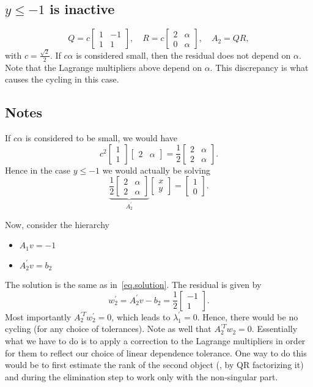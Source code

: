 \documentclass[12pt]{article}
\begin{document}
\subsection{$y \leq -1$ is inactive}

\[
Q = c\begin{bmatrix} 1 & -1 \\ 1 & 1\end{bmatrix}, \quad
R = c\begin{bmatrix} 2 & \alpha \\ 0 & \alpha \end{bmatrix}, \quad
A_2 = QR,
\]
%
with $c = \frac{\sqrt{2}}{2}$. If $c\alpha$ is considered small, then the residual does not depend
on $\alpha$. Note that the Lagrange multipliers above depend on $\alpha$. This discrepancy is what
causes the cycling in this case.

\subsection{Notes}

If $c\alpha$ is considered to be small, we would have
%
\[
c^2\begin{bmatrix} 1 \\ 1 \end{bmatrix}
\begin{bmatrix} 2 & \alpha \end{bmatrix} =
\frac{1}{2}\begin{bmatrix} 2 & \alpha \\ 2 & \alpha \end{bmatrix}.
\]
%
Hence in the case $y \leq -1$ we would actually be solving
%
\[
\underbrace{\frac{1}{2}\begin{bmatrix} 2 & \alpha \\ 2 & \alpha \end{bmatrix}}_{A_2^{'}}
\begin{bmatrix} x \\y \end{bmatrix} = \begin{bmatrix} 1 \\ 0 \end{bmatrix}.
\]

Now, consider the hierarchy
%
\begin{itemize}
\item $A_1v = -1$
\item $A_2^{'}v = b_2$
\end{itemize}
%
The solution is the same as in~\eqref{eq.solution}. The residual is given by
%
\[
w_2^{'} = A_2^{'} v - b_2 =
\frac{1}{2}\begin{bmatrix} -1 \\ 1 \end{bmatrix}.
\]
%
Most importantly $A_2^{'T}w_2^{'} = 0$, which leads to $\lambda_1^{'} = 0$. Hence, there would be no
cycling (for any choice of tolerances). Note as well that $A_2^{'T}w_2 = 0$. Essentially what we
have to do is to apply a correction to the Lagrange multipliers in order for them to reflect our
choice of linear dependence tolerance. One way to do this would be to first estimate the rank of the
second object (\eg, by QR factorizing it) and during the elimination step to work only with the
non-singular part.
\end{document}
